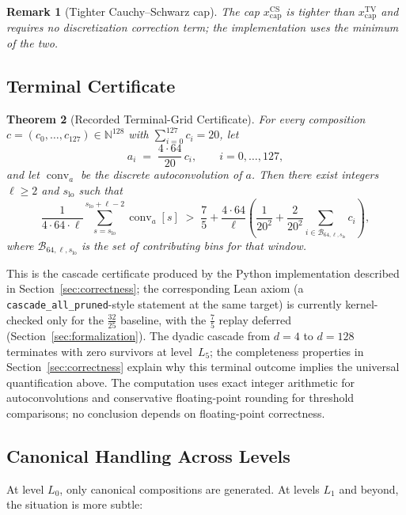 \documentclass[11pt, letterpaper]{article}
\theoremstyle{paperplain}
\newtheorem{theorem}{Theorem}[section]
\theoremstyle{paperdef}
\newtheorem{remark}[theorem]{Remark}
\newcommand{\N}{\mathbb{N}}
\newcommand{\conv}{\operatorname{conv}}
\begin{document}
\begin{remark}[Tighter Cauchy--Schwarz cap]
The cap $x_{\mathrm{cap}}^{\mathrm{CS}}$ is tighter than
$x_{\mathrm{cap}}^{\mathrm{TV}}$ and requires no discretization
correction term; the implementation uses the minimum of the two.
\end{remark}

\subsection{Terminal Certificate}

\begin{theorem}[Recorded Terminal-Grid Certificate]
\label{thm:cascade-sound}
For every composition $c = (c_0,\ldots,c_{127}) \in \N^{128}$ with
$\sum_{i=0}^{127} c_i = 20$, let
\[
  a_i \;=\; \frac{4 \cdot 64}{20}\, c_i,
  \qquad i = 0,\ldots,127,
\]
and let $\conv_a$ be the discrete autoconvolution of $a$.  Then there
exist integers $\ell \ge 2$ and
$s_{\mathrm{lo}}$ such that
\[
  \frac{1}{4 \cdot 64 \cdot \ell}
  \sum_{s=s_{\mathrm{lo}}}^{s_{\mathrm{lo}}+\ell-2} \conv_a[s]
  \;>\;
  \frac75
  +
  \frac{4 \cdot 64}{\ell}
  \left(
    \frac{1}{20^2}
    +
    \frac{2}{20^2}
    \sum_{i \in \mathcal{B}_{64,\ell,s_{\mathrm{lo}}}} c_i
  \right),
\]
where $\mathcal{B}_{64,\ell,s_{\mathrm{lo}}}$ is the set of contributing
bins for that window.
\end{theorem}

This is the cascade certificate produced by the Python implementation
described in Section~\ref{sec:correctness}; the corresponding Lean
axiom (a \texttt{cascade\_all\_pruned}-style statement at the same
target) is currently kernel-checked only for the $\tfrac{32}{25}$
baseline, with the $\tfrac{7}{5}$ replay deferred
(Section~\ref{sec:formalization}).  The dyadic cascade from $d=4$ to
$d=128$ terminates with zero survivors at level~$L_5$; the
completeness properties in Section~\ref{sec:correctness} explain why
this terminal outcome implies the universal quantification above.
The computation uses exact integer arithmetic for autoconvolutions
and conservative floating-point rounding for threshold comparisons;
no conclusion depends on floating-point correctness.

\subsection{Canonical Handling Across Levels}

At level $L_0$, only canonical compositions are generated.  At levels
$L_1$ and beyond, the situation is more subtle:
\end{document}
